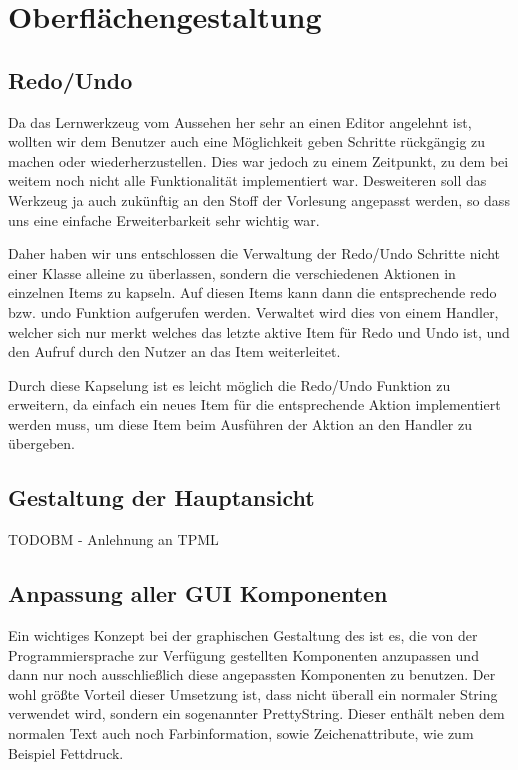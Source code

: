 

\chapter{Oberflächengestaltung}\label{GUI}


\section{Redo/Undo}

Da das Lernwerkzeug vom Aussehen her sehr an einen Editor angelehnt ist,
wollten wir dem Benutzer auch eine Möglichkeit geben Schritte rückgängig zu
machen oder wiederherzustellen. Dies war jedoch zu einem Zeitpunkt, zu dem bei
weitem noch nicht alle Funktionalität implementiert war. Desweiteren soll das
Werkzeug ja auch zukünftig an den Stoff der Vorlesung angepasst werden, so dass
uns eine einfache Erweiterbarkeit sehr wichtig war.\vspace{10pt}

Daher haben wir uns entschlossen die Verwaltung der Redo/Undo Schritte nicht
einer Klasse alleine zu überlassen, sondern die verschiedenen Aktionen in
einzelnen Items zu kapseln. Auf diesen Items kann dann die entsprechende redo
bzw. undo Funktion aufgerufen werden. Verwaltet wird dies von einem Handler,
welcher sich nur merkt welches das letzte aktive Item für Redo und Undo ist,
und den Aufruf durch den Nutzer an das Item weiterleitet.\vspace{10pt}

Durch diese Kapselung ist es leicht möglich die Redo/Undo Funktion zu
erweitern, da einfach ein neues Item für die entsprechende Aktion implementiert
werden muss, um diese Item beim Ausführen der Aktion an den Handler zu
übergeben.


\section{Gestaltung der Hauptansicht}

TODOBM - Anlehnung an TPML


\section{Anpassung aller GUI Komponenten}

Ein wichtiges Konzept bei der graphischen Gestaltung des \gtitool ist es, die von
der Programmiersprache zur Verfügung gestellten Komponenten anzupassen und dann
nur noch ausschließlich diese angepassten Komponenten zu benutzen. Der wohl
größte Vorteil dieser Umsetzung ist, dass nicht überall ein normaler String
verwendet wird, sondern ein sogenannter PrettyString. Dieser enthält neben dem
normalen Text auch noch Farbinformation, sowie Zeichenattribute, wie zum
Beispiel Fettdruck.\vspace{10pt}

